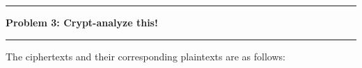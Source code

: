 \documentclass[11pt]{article}
\newcommand\question[2]{\vspace{.25in}\hrule\textbf{#1: #2}\vspace{.5em}\hrule\vspace{.10in}}
\begin{document}
\question{Problem 3}{Crypt-analyze this!}
	The ciphertexts and their corresponding plaintexts are as follows:
\end{document}
